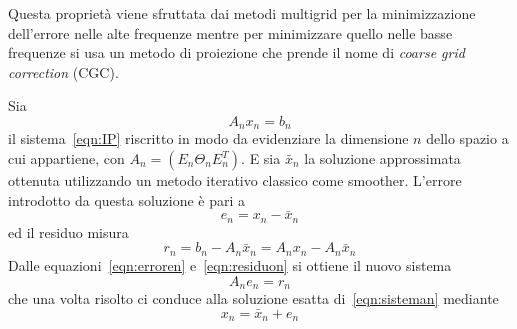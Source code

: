 
Questa proprietà viene sfruttata dai metodi multigrid per la minimizzazione dell'errore nelle alte frequenze mentre per minimizzare quello nelle basse frequenze si usa un metodo di proiezione che prende il nome di \emph{coarse grid correction} (CGC).

Sia
\begin{equation}
\label{eqn:sisteman}
A_nx_n = b_n
\end{equation}
il sistema~\eqref{eqn:IP} riscritto in modo da evidenziare la dimensione $n$ dello spazio a cui appartiene, con $A_n = (E_n \Theta_n E_n^T )$.
E sia $\bar{x}_n$ la soluzione approssimata ottenuta utilizzando un metodo iterativo classico come smoother.
L'errore introdotto da questa soluzione è pari a
\begin{equation}
\label{eqn:erroren}
e_n = x_n - \bar{x}_n
\end{equation}
ed il residuo misura 
\begin{equation}
\label{eqn:residuon}
r_n = b_n -A_n \bar{x}_n = A_n x_n - A_n \bar{x}_n
\end{equation}
Dalle equazioni~\eqref{eqn:erroren} e~\eqref{eqn:residuon} si ottiene il nuovo sistema
\begin{equation}
\label{eqn:sistemaErrore}
A_n e_n = r_n
\end{equation}
che una volta risolto ci conduce alla soluzione esatta di~\eqref{eqn:sisteman} mediante
\begin{equation}
\label{eqn:diretta}
x_n = \bar{x}_n + e_n
\end{equation}

